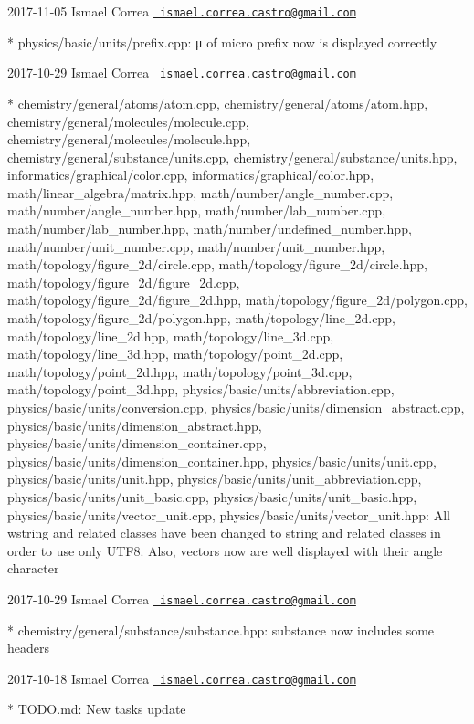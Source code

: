  2017-\/11-\/05 Ismael Correa \href{mailto:ismael.correa.castro@gmail.com}{\texttt{ ismael.\+correa.\+castro@gmail.\+com}} \begin{DoxyVerb}* physics/basic/units/prefix.cpp: μ of micro prefix now is
displayed correctly
\end{DoxyVerb}
 2017-\/10-\/29 Ismael Correa \href{mailto:ismael.correa.castro@gmail.com}{\texttt{ ismael.\+correa.\+castro@gmail.\+com}} \begin{DoxyVerb}* chemistry/general/atoms/atom.cpp,
chemistry/general/atoms/atom.hpp,
chemistry/general/molecules/molecule.cpp,
chemistry/general/molecules/molecule.hpp,
chemistry/general/substance/units.cpp,
chemistry/general/substance/units.hpp,
informatics/graphical/color.cpp, informatics/graphical/color.hpp,
math/linear_algebra/matrix.hpp, math/number/angle_number.cpp,
math/number/angle_number.hpp, math/number/lab_number.cpp,
math/number/lab_number.hpp, math/number/undefined_number.hpp,
math/number/unit_number.cpp, math/number/unit_number.hpp,
math/topology/figure_2d/circle.cpp,
math/topology/figure_2d/circle.hpp,
math/topology/figure_2d/figure_2d.cpp,
math/topology/figure_2d/figure_2d.hpp,
math/topology/figure_2d/polygon.cpp,
math/topology/figure_2d/polygon.hpp, math/topology/line_2d.cpp,
math/topology/line_2d.hpp, math/topology/line_3d.cpp,
math/topology/line_3d.hpp, math/topology/point_2d.cpp,
math/topology/point_2d.hpp, math/topology/point_3d.cpp,
math/topology/point_3d.hpp, physics/basic/units/abbreviation.cpp,
physics/basic/units/conversion.cpp,
physics/basic/units/dimension_abstract.cpp,
physics/basic/units/dimension_abstract.hpp,
physics/basic/units/dimension_container.cpp,
physics/basic/units/dimension_container.hpp,
physics/basic/units/unit.cpp, physics/basic/units/unit.hpp,
physics/basic/units/unit_abbreviation.cpp,
physics/basic/units/unit_basic.cpp,
physics/basic/units/unit_basic.hpp,
physics/basic/units/vector_unit.cpp,
physics/basic/units/vector_unit.hpp: All wstring and related classes
have been changed to string and related classes in order to use only
UTF8. Also, vectors now are well displayed with their angle
character
\end{DoxyVerb}
 2017-\/10-\/29 Ismael Correa \href{mailto:ismael.correa.castro@gmail.com}{\texttt{ ismael.\+correa.\+castro@gmail.\+com}} \begin{DoxyVerb}* chemistry/general/substance/substance.hpp: substance now includes
some headers
\end{DoxyVerb}
 2017-\/10-\/18 Ismael Correa \href{mailto:ismael.correa.castro@gmail.com}{\texttt{ ismael.\+correa.\+castro@gmail.\+com}} \begin{DoxyVerb}* TODO.md: New tasks update
\end{DoxyVerb}
